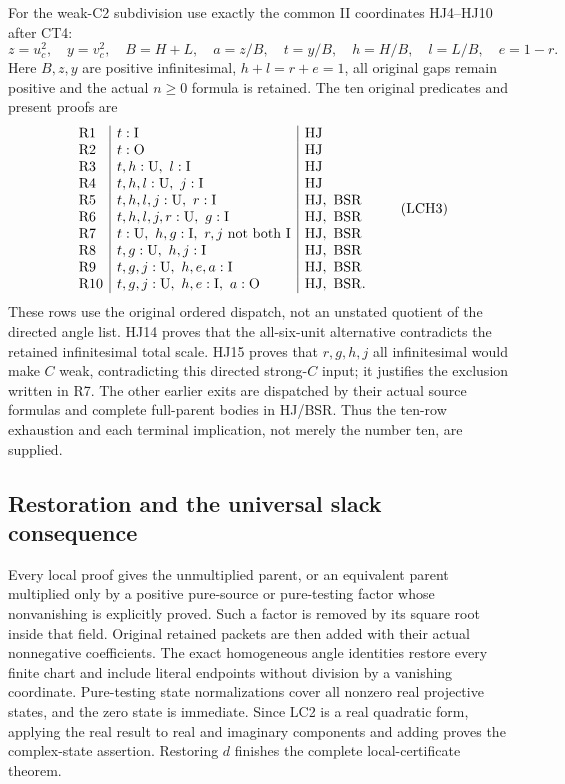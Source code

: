 For the weak-C2 subdivision use exactly the common II
coordinates HJ4--HJ10 after CT4:
\[
 z=u_c^2,\quad y=v_c^2,\quad B=H+L,\quad
 a=z/B,\quad t=y/B,\quad h=H/B,\quad l=L/B,\quad e=1-r.
\]
Here \(B,z,y\) are positive infinitesimal,
\(h+l=r+e=1\), all original gaps remain positive and
the actual \(n\geq0\) formula is retained.  The ten
original predicates and present proofs are
\[
\begin{array}{l|l|l}
{\rm R1}&t:{\rm I}&{\rm HJ}\\
{\rm R2}&t:{\rm O}&{\rm HJ}\\
{\rm R3}&t,h:{\rm U},\ l:{\rm I}&{\rm HJ}\\
{\rm R4}&t,h,l:{\rm U},\ j:{\rm I}&{\rm HJ}\\
{\rm R5}&t,h,l,j:{\rm U},\ r:{\rm I}&{\rm HJ,\ BSR}\\
{\rm R6}&t,h,l,j,r:{\rm U},\ g:{\rm I}&{\rm HJ,\ BSR}\\
{\rm R7}&t:{\rm U},\ h,g:{\rm I},\
                     r,j\text{ not both I}&{\rm HJ,\ BSR}\\
{\rm R8}&t,g:{\rm U},\ h,j:{\rm I}&{\rm HJ,\ BSR}\\
{\rm R9}&t,g,j:{\rm U},\ h,e,a:{\rm I}&{\rm HJ,\ BSR}\\
{\rm R10}&t,g,j:{\rm U},\ h,e:{\rm I},\ a:{\rm O}&{\rm HJ,\ BSR}.
\end{array}\tag{LCH3}
\]
These rows use the original ordered dispatch, not an
unstated quotient of the directed angle list.
HJ14 proves that the all-six-unit alternative contradicts
the retained infinitesimal total scale.
HJ15 proves that \(r,g,h,j\) all infinitesimal would make
\(C\) weak, contradicting this directed strong-\(C\)
input; it justifies the exclusion written in R7.
The other earlier exits are dispatched by their actual
source formulas and complete full-parent bodies in HJ/BSR.
Thus the ten-row exhaustion and each terminal implication,
not merely the number ten, are supplied.

\subsection{Restoration and the universal slack consequence}

Every local proof gives the unmultiplied parent, or an
equivalent parent multiplied only by a positive pure-source
or pure-testing factor whose nonvanishing is explicitly
proved.  Such a factor is removed by its square root inside
that field.  Original retained packets are then added with
their actual nonnegative coefficients.
The exact homogeneous angle identities restore every finite
chart and include literal endpoints without division by
a vanishing coordinate.  Pure-testing state normalizations
cover all nonzero real projective states, and the zero state
is immediate.  Since LC2 is a real quadratic form, applying
the real result to real and imaginary components and adding
proves the complex-state assertion.  Restoring \(d\)
finishes the complete local-certificate theorem.


